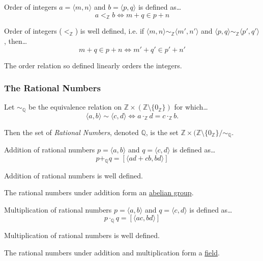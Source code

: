 \noindent Order of integers $a = \langle m, n \rangle$ and $b = \langle p, q \rangle$ is defined as\dots
$$a <_{\mathbb{Z}} b \Leftrightarrow m + q \in p + n$$

\begin{lemma}
Order of integers ($<_{\mathbb{Z}}$) is well defined, i.e. if $\langle m,n \rangle \sim_{\mathbb{Z}} \langle m',n' \rangle$ and $\langle p,q \rangle \sim_{\mathbb{Z}} \langle p',q' \rangle$, then\dots
$$m + q \in p + n \Leftrightarrow m' + q' \in p' + n'$$
\end{lemma}

\noindent The order relation so defined linearly orders the integers.

\subsubsection{The Rational Numbers}\label{rationals}

Let $\sim_{\mathbb{Q}}$ be the equivalence relation on $\mathbb{Z} \times (\mathbb{Z} \setminus \{0_{\mathbb{Z}}\})$ for which\dots
$$\langle a,b \rangle \sim \langle c,d \rangle \Leftrightarrow a \cdot_{\mathbb{Z}} d = c \cdot_{\mathbb{Z}} b.$$

\noindent Then the set of \emph{Rational Numbers}, denoted $\mathbb{Q}$, is the set $\mathbb{Z} \times (\mathbb{Z} \setminus \{ 0_{\mathbb{Z}} \} / \sim_{\mathbb{Q}}.$\newline

\noindent Addition of rational numbers $p = \langle a, b \rangle$ and $q = \langle c, d \rangle$ is defined as\dots
$$p +_{\mathbb{Q}} q = [\langle ad+cb, bd \rangle]$$

\begin{lemma}
Addition of rational numbers is well defined.
\end{lemma}

\noindent The rational numbers under addition form an \hyperref[grouptheory]{abelian group}.\newline

\noindent Multiplication of rational numbers $p = \langle a, b \rangle$ and $q = \langle c, d \rangle$ is defined as\dots
$$p \cdot_{\mathbb{Q}} q = [\langle ac, bd \rangle]$$

\begin{lemma}
Multiplication of rational numbers is well defined.
\end{lemma}

\noindent The rational numbers under addition and multiplication form a \hyperref[ringtheory]{field}.\newline

